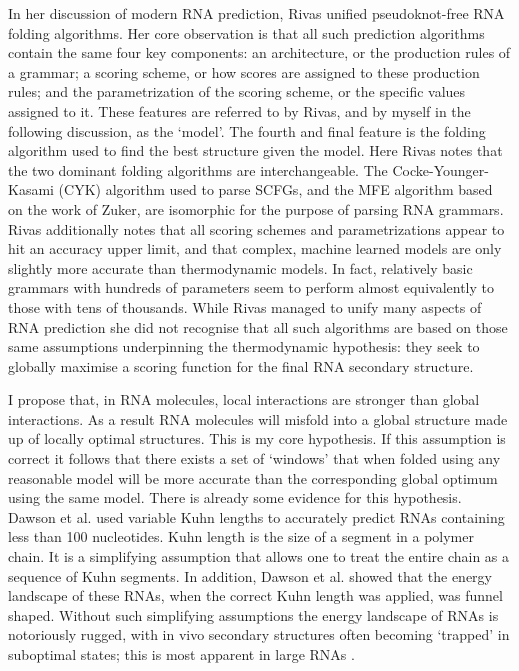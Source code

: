\documentclass{cshonours}
\begin{document}
In her discussion of modern RNA prediction, Rivas \cite{rivas2013four} unified pseudoknot-free RNA folding algorithms. Her core observation is that all such prediction algorithms contain the same four key components: an architecture, or the production rules of a grammar; a scoring scheme, or how scores are assigned to these production rules; and the parametrization of the scoring scheme, or the specific values assigned to it. These features are referred to by Rivas, and by myself in the following discussion, as the `model'. The fourth and final feature is the folding algorithm used to find the best structure given the model. Here Rivas notes that the two dominant folding algorithms are interchangeable. The Cocke-Younger-Kasami (CYK) algorithm used to parse SCFGs, and the MFE algorithm based on the work of Zuker, are isomorphic for the purpose of parsing RNA grammars. Rivas additionally notes that all scoring schemes and parametrizations appear to hit an accuracy upper limit, and that complex, machine learned models are only slightly more accurate than thermodynamic models. In fact, relatively basic grammars with hundreds of parameters seem to perform almost equivalently to those with tens of thousands. While Rivas managed to unify many aspects of RNA prediction she did not recognise that all such algorithms are based on those same assumptions underpinning the thermodynamic hypothesis: they seek to globally maximise a scoring function for the final RNA secondary structure. 

I propose that, in RNA molecules, local interactions are stronger than global interactions. As a result RNA molecules will misfold into a global structure made up of locally optimal structures. This is my core hypothesis. If this assumption is correct it follows that there exists a set of `windows' that when folded using any reasonable model will be more accurate than the corresponding global optimum using the same model. There is already some evidence for this hypothesis. Dawson et al. \cite{dawson2013new} used variable Kuhn lengths to accurately predict RNAs containing less than 100 nucleotides. Kuhn length is the size of a segment in a polymer chain. It is a simplifying assumption that allows one to treat the entire chain as a sequence of Kuhn segments. In addition, Dawson et al. showed that the energy landscape of these RNAs, when the correct Kuhn length was applied, was funnel shaped. Without such simplifying assumptions the energy landscape of RNAs is notoriously rugged, with in vivo secondary structures often becoming `trapped' in suboptimal states; this is most apparent in large RNAs \cite{ditzler2008rugged}.
\end{document}

